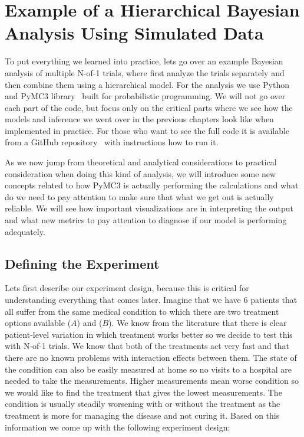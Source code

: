 \documentclass[12pt,a4paper,leqno]{report}
\theoremstyle{plain}
\theoremstyle{definition}
\theoremstyle{remark}
\begin{document}
\chapter{Example of a Hierarchical Bayesian Analysis Using Simulated
  Data}\label{example}

To put everything we learned into practice, lets go over an example Bayesian
analysis of multiple N-of-1 trials, where first analyze the trials separately and then combine
them using a hierarchical model. For the analysis we use Python and PyMC3 library\ \cite{pymc3} built
for probabilistic programming. We will not go over each part of the code, but focus only
on the critical parts where we see how the models and inference we went over in the
previous chapters look like when implemented in practice. For those who want to see the
full code it is available from a GitHub repository\ \cite{github} with instructions how
to run it.

As we now jump from theoretical and analytical considerations to practical consideration
when doing this kind of analysis, we will introduce some new concepts related to how
PyMC3 is actually performing the calculations and what do we need to pay attention to
make sure that what we get out is actually reliable. We will see how important
visualizations are in interpreting the output and what new metrics to pay attention
to diagnose if our model is performing adequately.

\section{Defining the Experiment}

Lets first describe our experiment design, because this is critical for understanding
everything that comes later. Imagine that we have 6 patients that all suffer from the
same medical condition to which there are two treatment options available (\(A\)) and (\(B\)). We know from the
literature that there is clear patient-level variation in which treatment works better
so we decide to test this with N-of-1 trials. We know that both of the treatments act
very fast and that there are no known problems with interaction effects between them.
The state of the condition can also be easily measured at home so no visits to
a hospital are needed to take the measurements. Higher measurements mean worse condition
so we would like to find the treatment that gives the lowest measurements. The condition is usually steadily
worsening with or without the treatment as the treatment is more for managing the
disease and not curing it. Based on this information we come up with the following experiment design:
\end{document}

